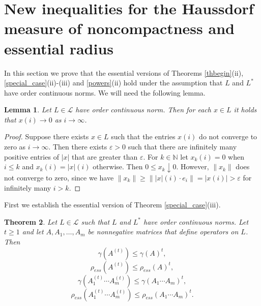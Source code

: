 \documentclass[12pt, reqno]{amsart}
\newtheorem{theorem}{Theorem}[section]
\newtheorem{lemma}[theorem]{Lemma}
\theoremstyle{definition}
\theoremstyle{remark}
\numberwithin{equation}{section}
\newcommand{\be}{\begin{equation}}
\newcommand{\ee}{\end{equation}}
\newcommand{\NN}{\mathbb{N}}
\begin{document}
\section{New inequalities for the Haussdorf measure of noncompactness and essential radius}

In this section we prove that the essential versions of Theorems \ref{thbegin}(ii), \ref{special_case}(ii)-(iii) and \ref{powers}(ii) hold under the assumption that $L$ and $L^*$ have order continuous norms. We will need the following lemma.


\begin{lemma}
Let $L\in \mathcal{L}$ have order continuous norm. Then for each $x\in L$ it holds that $x(i) \to 0$ as $i \to \infty$.
\label{property*}
\end{lemma}
\begin{proof} Suppose there exists $x\in L$ such that the entries $x(i)$  do not converge to zero as $i \to \infty$. Then there exists $\varepsilon > 0$ such that there are infinitely many positive entries of $|x|$ that are greater than $\varepsilon$. For $k  \in \NN$ let $x_k (i)=0$ when $i\le k$ and $x_k(i)=|x|(i)$ otherwise.
Then $0\le x_k \downarrow 0$.  However, $\|x_k\|$ does not converge to zero, since we have
 $\|x_k\| \ge \||x|(i) \cdot e_i\| =|x(i)| >\varepsilon$
  for infinitely many $i>k$.
\end{proof}
First we establish the essential version of Theorem \ref{special_case}(iii).
\begin{theorem}
\label{ess_needed}
Let $L\in \mathcal{L}$ such that %
$L$ and $L^*$ have order continuous norms. 
Let $t\ge 1$ and let $A, A_1, \ldots , A_m$ be  nonnegative matrices that define operators on $L$.  %
Then 
\be
\gamma (A^{(t)}) \le \gamma (A)^t,
\label{newH}
\ee
\be
\rho_{ess} (A^{(t)}) \le \rho_{ess} (A)^t,
\label{new_ess}
\ee
\be
\gamma (A_1^{(t)}\cdots A_m^{(t)})\le \gamma (A_1\cdots A_m)^{t},
\label{newH2}
\ee
\be
\rho_{ess}(A_1^{(t)}\cdots A_m^{(t)})\le\rho_{ess} (A_1\cdots A_m)^{t}.
\label{new_ess2}
\ee
\end{theorem}
\end{document}

